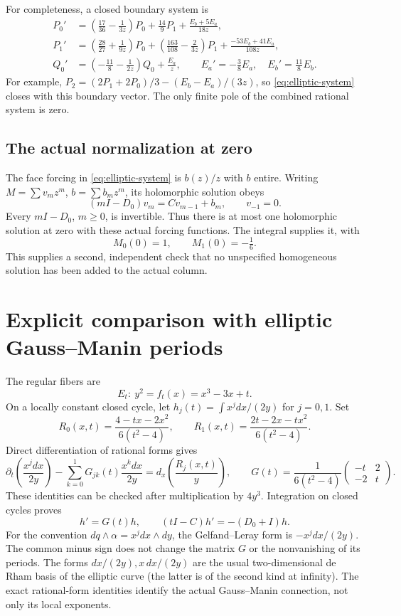 \documentclass[11pt]{article}
\numberwithin{equation}{section}
\theoremstyle{definition}
\theoremstyle{remark}
\begin{document}
For completeness, a closed boundary system is
\begin{align}
 P_0'&=\left(\frac{17}{36}-\frac1{3z}\right)P_0+
       \frac{14}{9}P_1+\frac{E_b+5E_a}{18z},\\
 P_1'&=\left(\frac{28}{27}+\frac1{9z}\right)P_0+
       \left(\frac{163}{108}-\frac2{3z}\right)P_1+
       \frac{-53E_b+41E_a}{108z},\\
 Q_0'&=\left(-\frac{11}{8}-\frac1{2z}\right)Q_0+\frac{E_a}{z},
 \qquad E_a'=-\tfrac38 E_a,\quad E_b'=\tfrac{11}{8}E_b.
\end{align}
For example, $P_2=(2P_1+2P_0)/3-(E_b-E_a)/(3z)$, so
\eqref{eq:elliptic-system} closes with this boundary vector. The only
finite pole of the combined rational system is zero.

\subsection{The actual normalization at zero}
The face forcing in \eqref{eq:elliptic-system} is $b(z)/z$ with $b$ entire.
Writing $M=\sum v_mz^m$, $b=\sum b_mz^m$, its holomorphic solution obeys
\[
 (mI-D_0)v_m=Cv_{m-1}+b_m,\qquad v_{-1}=0.
\]
Every $mI-D_0$, $m\ge0$, is invertible. Thus there is at most one
holomorphic solution at zero with these actual forcing functions. The
integral supplies it, with
\[
 M_0(0)=1,\qquad M_1(0)=-\tfrac16.
\]
This supplies a second, independent check that no unspecified homogeneous
solution has been added to the actual column.

\section{Explicit comparison with elliptic Gauss--Manin periods}
The regular fibers are
\[
 E_t:\ y^2=f_t(x)=x^3-3x+t.
\]
On a locally constant closed cycle, let
$h_j(t)=\int x^j dx/(2y)$ for $j=0,1$. Set
\[
 R_0(x,t)=\frac{4-tx-2x^2}{6(t^2-4)},\qquad
 R_1(x,t)=\frac{2t-2x-tx^2}{6(t^2-4)}.
\]
Direct differentiation of rational forms gives
\begin{equation}\label{eq:GLcertificate}
 \partial_t\left(\frac{x^jdx}{2y}\right)
 -\sum_{k=0}^1G_{jk}(t)\frac{x^kdx}{2y}
 =d_x\left(\frac{R_j(x,t)}{y}\right),
 \qquad
 G(t)=\frac1{6(t^2-4)}\begin{pmatrix}-t&2\\-2&t\end{pmatrix}.
\end{equation}
These identities can be checked after multiplication by $4y^3$.
Integration on closed cycles proves
\begin{equation}\label{eq:phase-GM}
 h'=G(t)h,\qquad (tI-C)h'=-(D_0+I)h.
\end{equation}
For the convention $dq\wedge\alpha=x^jdx\wedge dy$, the
Gelfand--Leray form is $-x^jdx/(2y)$. The common minus sign does not
change the matrix $G$ or the nonvanishing of its periods.
The forms $dx/(2y),x\,dx/(2y)$ are the usual two-dimensional de Rham
basis of the elliptic curve (the latter is of the second kind at infinity).
The exact rational-form identities identify the actual Gauss--Manin
connection, not only its local exponents.
\end{document}
